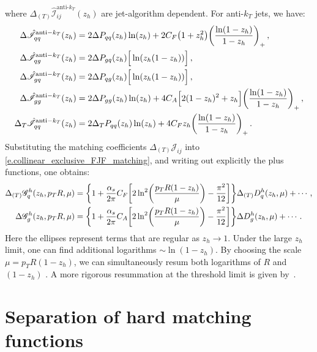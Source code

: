 \documentclass[a4paper, 11 pt]{article}
\begin{document}
where $\Delta _{(T)} \hat{\mathscr{I}}_{i j}^{{\text{anti-}k_T}}(z_h)$ are jet-algorithm dependent.
For anti-$k_T$ jets, we have:
\begin{align}
\Delta \hat{\mathscr{I}}_{qq}^{\text{anti}-k_T} \pqty{z_h}
& =
2 \Delta P_{qq}(z_h) \ln(z_h) + 2 C_F \pqty{1+z_h^2} \pqty{\frac{\ln(1-z_h)}{1-z_h}}_+
\, , \\
\Delta \hat{\mathscr{I}}_{qg}^{\text{anti}-k_T} \pqty{z_h}
& =
2 \Delta P_{gq}(z_h) \Big[\ln(z_h(1-z_h)) \Big]
\, , \\
\Delta \hat{\mathscr{I}}_{gq}^{\text{anti}-k_T} \pqty{z_h}
& =
2 \Delta P_{qg}(z_h) \Big[\ln(z_h(1-z_h)) \Big]
\, , \\
\Delta \hat{\mathscr{I}}_{gg}^{\text{anti}-k_T} \pqty{z_h}
& =
2 \Delta P_{gg}(z_h) \ln(z_h) + 4 C_A \Big[2(1-z_h)^2 + z_h\Big] \pqty{\frac{\ln(1-z_h)}{1-z_h}}_+
\, , \\
\Delta _T \hat{\mathscr{I}}_{qq}^{\text{anti}-k_T} \pqty{z_h}
& =
2 \Delta _T P_{qq}(z_h) \ln(z_h) + 4 C_F z_h \pqty{\frac{\ln (1-z_h)}{1-z_h}}_+
\, .
\end{align}
Substituting the matching coefficients $\Delta _{(T)} \mathscr{J}_{ij}$ into \cref{e.collinear_exclusive_FJF_matching}, and writing out explicitly the plus functions, one obtains:
\begin{align}
\Delta _{(T)} \mathscr{G}_q^h (z_h, p_TR, \mu)
& =
\Bqty{1 + \frac{\alpha _s}{2 \pi} C_F \bqty{2 \ln[2](\frac{p_TR(1-z_h)}{\mu}) - \frac{\pi^2}{12}}} \Delta _{(T)} D_q^h (z_h, \mu) + \cdots
\, , \\
\Delta \mathscr{G}_g^h (z_h, p_TR, \mu)
& =
\Bqty{1 + \frac{\alpha _s}{2 \pi} C_A \bqty{2 \ln[2](\frac{p_T R (1-z_h)}{\mu}) - \frac{\pi^2}{12}}} \Delta D_g^h (z_h, \mu) + \cdots
\, . 
\end{align}
Here the ellipses represent terms that are regular as $z_h \rightarrow 1$.
Under the large $z_h$ limit, one can find additional logarithms $\sim \ln(1-z_h)$. By choosing the scale $\mu = p_T R (1-z_h)$, we can simultaneously resum both logarithms of $R$ and $(1-z_h)$ \cite{Procura:2011aq}. A more rigorous resummation at the threshold limit is given by~\cite{Kaufmann:2019ksh}.

\section{Separation of hard matching functions}
\end{document}
